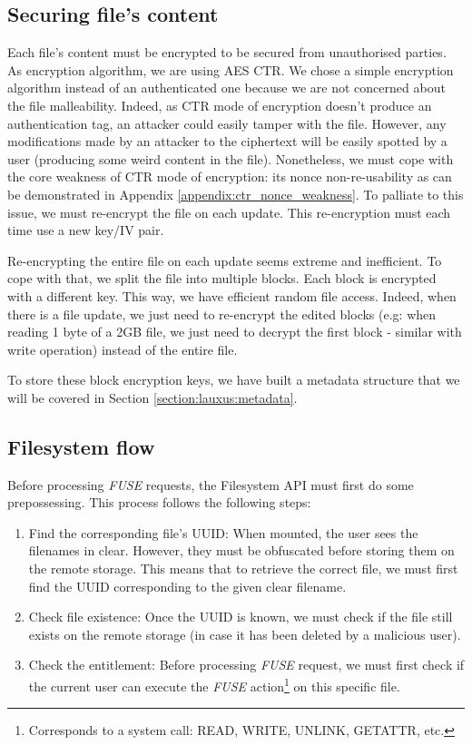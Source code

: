 \documentclass[../main.tex]{subfiles}
\begin{document}
\subsection{Securing file's content}
\label{section:lauxus:filesystem_encryption}

\par Each file's content must be encrypted to be secured from unauthorised parties. As encryption algorithm, we are using AES CTR. We chose a simple encryption algorithm instead of an authenticated one because we are not concerned about the file malleability. Indeed, as CTR mode of encryption doesn't produce an authentication tag, an attacker could easily tamper with the file. However, any modifications made by an attacker to the ciphertext will be easily spotted by a user (producing some weird content in the file). Nonetheless, we must cope with the core weakness of CTR mode of encryption: its nonce non-re-usability as can be demonstrated in Appendix \ref{appendix:ctr_nonce_weakness}. To palliate to this issue, we must re-encrypt the file on each update. This re-encryption must each time use a new key/IV pair.
\par Re-encrypting the entire file on each update seems extreme and inefficient. To cope with that, we split the file into multiple blocks. Each block is encrypted with a different key. This way, we have efficient random file access. Indeed, when there is a file update, we just need to re-encrypt the edited blocks (e.g: when reading 1 byte of a 2GB file, we just need to decrypt the first block - similar with write operation) instead of the entire file.
\par To store these block encryption keys, we have built a metadata structure that we will be covered in Section \ref{section:lauxus:metadata}.


\subsection{Filesystem flow}
\label{section:lauxus:filesystem_flow}

\par Before processing \textit{FUSE} requests, the Filesystem API must first do some prepossessing. This process follows the following steps:
\begin{enumerate}
    \item Find the corresponding file's UUID: When mounted, the user sees the filenames in clear. However, they must be obfuscated before storing them on the remote storage. This means that to retrieve the correct file, we must first find the UUID corresponding to the given clear filename.
    \item Check file existence: Once the UUID is known, we must check if the file still exists on the remote storage (in case it has been deleted by a malicious user).
    \item Check the entitlement: Before processing \textit{FUSE} request, we must first check if the current user can execute the \textit{FUSE} action\footnote{Corresponds to a system call: READ, WRITE, UNLINK, GETATTR, etc.} on this specific file.
\end{enumerate}
\end{document}
